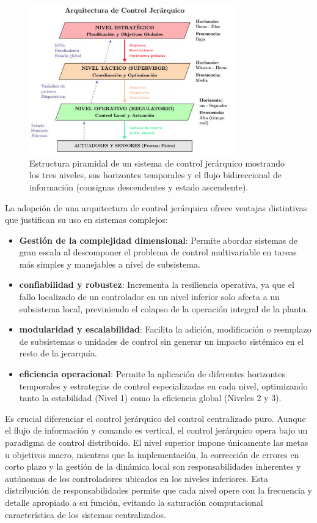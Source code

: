 \begin{figure}[H]
    \centering
    \includegraphics[width=0.8\textwidth]{img/jerarquia_control.png}
    \caption{Estructura piramidal de un sistema de control jerárquico mostrando los tres niveles, sus horizontes temporales y el flujo bidireccional de información (consignas descendentes y estado ascendente).}
    \label{fig:jerarquia_control}
\end{figure}
La adopción de una arquitectura de control jerárquica ofrece ventajas distintivas que justifican su uso en sistemas complejos:
\begin{itemize}[label=$\bullet$]
    \item \textbf{Gestión de la complejidad dimensional}: Permite abordar sistemas de gran escala al descomponer el problema de control multivariable en tareas más simples y manejables a nivel de subsistema.
    \item \textbf{confiabilidad y robustez}: Incrementa la resiliencia operativa, ya que el fallo localizado de un controlador en un nivel inferior solo afecta a un subsistema local, previniendo el colapso de la operación integral de la planta.
    \item \textbf{modularidad y escalabilidad}: Facilita la adición, modificación o reemplazo de subsistemas o unidades de control sin generar un impacto sistémico en el resto de la jerarquía.
    \item \textbf{eficiencia operacional}: Permite la aplicación de diferentes horizontes temporales y estrategias de control especializadas en cada nivel, optimizando tanto la estabilidad (Nivel 1) como la eficiencia global (Niveles 2 y 3).
\end{itemize}
Es crucial diferenciar el control jerárquico del control centralizado puro. Aunque el flujo de información y comando es vertical, el control jerárquico opera bajo un paradigma de control distribuido. El nivel superior impone únicamente las metas u objetivos macro, mientras que la implementación, la corrección de errores en corto plazo y la gestión de la dinámica local son responsabilidades inherentes y autónomas de los controladores ubicados en los niveles inferiores. Esta distribución de responsabilidades permite que cada nivel opere con la frecuencia y detalle apropiado a su función, evitando la saturación computacional característica de los sistemas centralizados.

